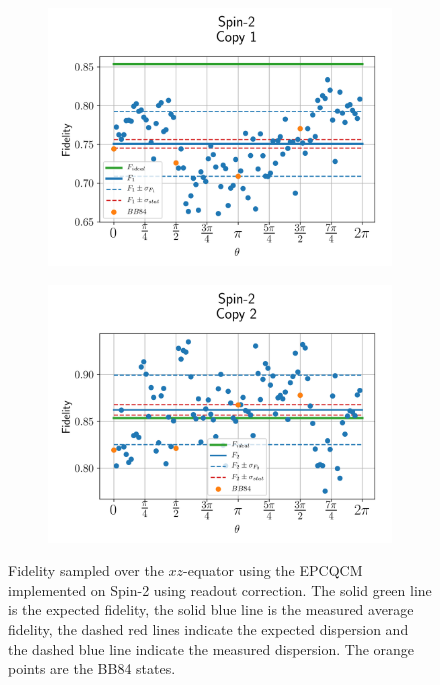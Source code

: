 \begin{figure}[H]
  \centering
  \begin{subfigure}{.5\textwidth}
    \centering
    \includegraphics[width=\textwidth]{Figures/Economical/Spin2/OnlyEquator/results_spin2_corrected_copy1.png}
    \label{fig:epc_corrected_spin2_equator_1}
  \end{subfigure}%
  \begin{subfigure}{.5\textwidth}
    \centering
    \includegraphics[width=\textwidth]{Figures/Economical/Spin2/OnlyEquator/results_spin2_corrected_copy2.png}
    \label{fig:epc_corrected_spin2_equator_2}
  \end{subfigure}
  \vspace{-0.5cm}
  \caption{Fidelity sampled over the $xz$-equator using the EPCQCM implemented on Spin-2 using readout correction.
  The solid green line is the expected fidelity, the solid blue line is the measured average fidelity, the dashed red lines indicate the expected dispersion and the dashed blue line indicate the measured dispersion. The orange points are the BB84 states.}
  \label{fig:epc_corrected_spin2_equator}
\end{figure}


